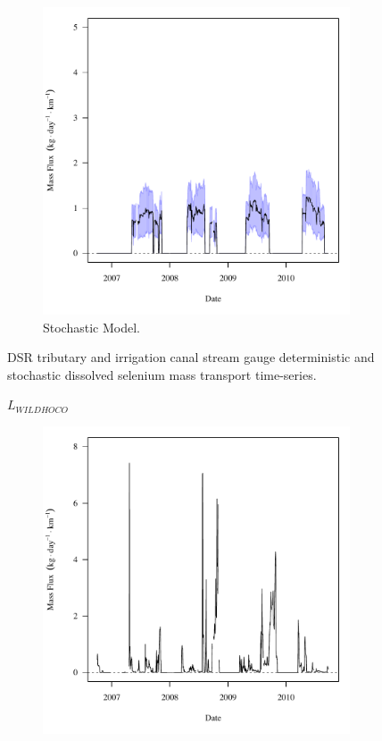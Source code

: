 \begin{linenumbers}
\begin{landscape}
\begin{figure}
\begin{subfigure}{0.7\textwidth}
			\includegraphics[width=\tableCustomSize]{"Figures/Results_DSR/Stochastic/f FRO"}
			\caption{Stochastic Model.}
		\end{subfigure}
		\caption{DSR tributary and irrigation canal stream gauge deterministic and stochastic dissolved selenium mass transport time-series.}
	\end{figure}
\end{landscape}
\subfiguremid
\begin{landscape}
	\begin{figure}
		$ \displaystyle L_{WILDHOCO} $
		\begin{subfigure}{0.7\textwidth}
			\centering
			\includegraphics[width=\tableCustomSize]{"Figures/Results_DSR/Deterministic/f WIL"}

\end{subfigure}
\end{figure}
\end{landscape}
\end{linenumbers}
